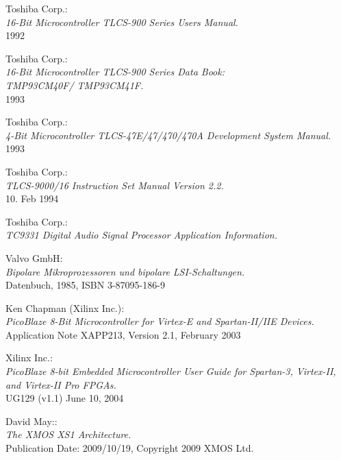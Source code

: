  Toshiba Corp.: \\
                  {\em 16-Bit Microcontroller TLCS-900 Series Users
                  Manual.\/} \\
                  1992

 Toshiba Corp.: \\
                   {\em 16-Bit Microcontroller TLCS-900 Series Data Book: \\
                    TMP93CM40F/ TMP93CM41F.\/} \\
                   1993

 Toshiba Corp.: \\
                 {\em 4-Bit Microcontroller TLCS-47E/47/470/470A Development
                  System Manual.\/} \\
                 1993

 Toshiba Corp.: \\
                   {\em TLCS-9000/16 Instruction Set Manual Version
                   2.2.\/} \\
                   10. Feb 1994

 Toshiba Corp.: \\
                   {\em TC9331 Digital Audio Signal Processor
                   Application Information.}

 Valvo GmbH: \\
                {\em Bipolare Mikroprozessoren und bipolare
                LSI-Schaltungen.\/} \\
                Datenbuch, 1985, ISBN 3-87095-186-9

 Ken Chapman (Xilinx Inc.):\\
                 {\em PicoBlaze 8-Bit Microcontroller for Virtex-E
                 and Spartan-II/IIE Devices.\/} \\
                 Application Note XAPP213, Version 2.1, February 2003

 Xilinx Inc.: \\
                 {\em PicoBlaze 8-bit Embedded Microcontroller User Guide
                 for Spartan-3, Virtex-II, and Virtex-II Pro FPGAs.\/} \\
                 UG129 (v1.1) June 10, 2004
                          
 David May:: \\
               {\em The XMOS XS1 Architecture.\/} \\
               Publication Date: 2009/10/19, Copyright 2009 XMOS Ltd.

